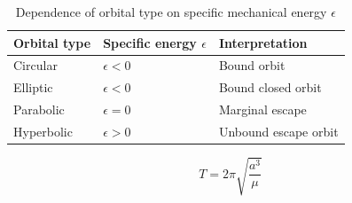 \documentclass[11pt]{article}
\begin{document}
\begin{table}[h]
    \centering
    \caption{Dependence of orbital type on specific mechanical energy $\epsilon$}
    \begin{tabular}{lll}
        \hline
        Orbital type & Specific energy $\epsilon$ & Interpretation       \\
        \hline
        Circular     & $\epsilon < 0$             & Bound orbit          \\
        Elliptic     & $\epsilon < 0$             & Bound closed orbit   \\
        Parabolic    & $\epsilon = 0$             & Marginal escape      \\
        Hyperbolic   & $\epsilon > 0$             & Unbound escape orbit \\
        \hline
    \end{tabular}
\end{table}
\begin{equation}
    T = 2\pi \sqrt{\frac{a^3}{\mu}}
\end{equation}
\end{document}
